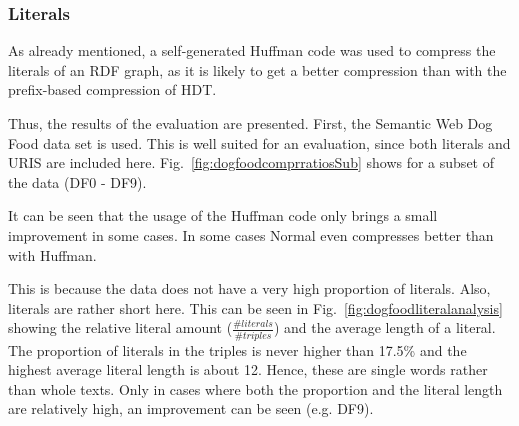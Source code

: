 \subsubsection{Literals}\label{sec:evaluationLiterals}

As already mentioned, a self-generated Huffman code was used to compress the literals of an RDF graph, as it is likely to get a better compression than with the prefix-based compression of HDT.

Thus, the results of the evaluation are presented. First, the Semantic Web Dog Food data set is used. This is well suited for an evaluation, since both literals and URIS are included here. Fig.~\ref{fig:dogfoodcomprratiosSub} shows  for a subset of the data (DF0 - DF9). 

It can be seen that the usage of the Huffman code only brings a small improvement in some cases. In some cases Normal \DHDT{} even compresses better than \DHDT{} with Huffman.

This is because the data does not have a very high proportion of literals. Also, literals are rather short here. This can be seen in Fig.~\ref{fig:dogfoodliteralanalysis} showing the relative literal amount ($\frac{\#literals}{\#triples}$) and the average length of a literal. The proportion of literals in the triples is never higher than 17.5\% and the highest average literal length is about 12. Hence, these are single words rather than whole texts. Only in cases where both the proportion and the literal length are relatively high, an improvement can be seen (e.g. DF9).


